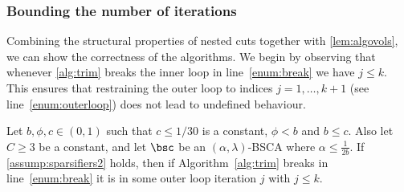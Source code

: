 \subsubsection{Bounding the number of iterations}
\label{subsubsec:iter}

\noindent
Combining the structural properties of nested cuts together with \cref{lem:algovols}, we can show the correctness of the algorithms. We begin by observing that whenever \cref{alg:trim} breaks the inner loop in line~\eqref{enum:break} we have $j \le k$. This ensures that restraining the outer loop to indices $j=1,\dots, k+1$ (see line~\eqref{enum:outerloop}) does not lead to undefined behaviour.

\begin{lemma}
	\label{lem:boundouterloop}
	Let $b, \phi,c \in (0,1)$ such that $c \leq 1/30$ is a constant, $\phi < b$ and $b \le c$. Also let $C \ge 3$ be a constant, and let $\bsc$ be an $(\alpha,\lambda)$-BSCA where $\alpha \le \frac{1}{2b}$. If \cref{assump:sparsifiers2} holds, then if Algorithm~\ref{alg:trim} breaks in line~\eqref{enum:break} it is in some outer loop iteration $j$ with $j \le k$.
\end{lemma}
